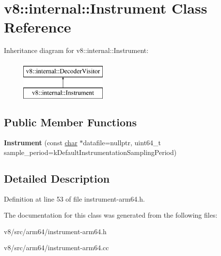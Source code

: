 \hypertarget{classv8_1_1internal_1_1Instrument}{}\section{v8\+:\+:internal\+:\+:Instrument Class Reference}
\label{classv8_1_1internal_1_1Instrument}
Inheritance diagram for v8\+:\+:internal\+:\+:Instrument\+:\begin{figure}[H]
\begin{center}
\leavevmode
\includegraphics[height=2.000000cm]{classv8_1_1internal_1_1Instrument}
\end{center}
\end{figure}
\subsection*{Public Member Functions}
\begin{DoxyCompactItemize}
\item 
\mbox{\label{classv8_1_1internal_1_1Instrument_a5e9f951cba127546de6e8ad32fe780ff}} 
{\bfseries Instrument} (const \mbox{\hyperlink{classchar}{char}} $\ast$datafile=nullptr, uint64\+\_\+t sample\+\_\+period=k\+Default\+Instrumentation\+Sampling\+Period)
\end{DoxyCompactItemize}


\subsection{Detailed Description}


Definition at line 53 of file instrument-\/arm64.\+h.



The documentation for this class was generated from the following files\+:\begin{DoxyCompactItemize}
\item 
v8/src/arm64/instrument-\/arm64.\+h\item 
v8/src/arm64/instrument-\/arm64.\+cc\end{DoxyCompactItemize}
